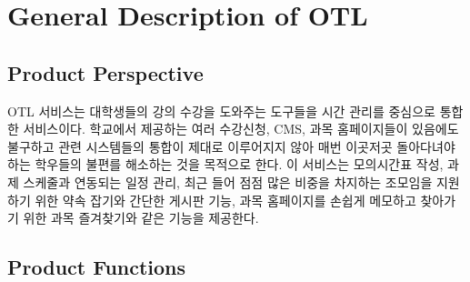 \documentclass[a4paper,titlepage]{article}
\begin{document}
\pagebreak
\section{General Description of OTL}
\subsection{Product Perspective}

OTL 서비스는 대학생들의 강의 수강을 도와주는 도구들을 시간 관리를 중심으로 통합한 서비스이다.
학교에서 제공하는 여러 수강신청, CMS, 과목 홈페이지들이 있음에도 불구하고 관련 시스템들의 통합이 제대로 이루어지지 않아 매번 이곳저곳 돌아다녀야 하는 학우들의 불편를 해소하는 것을 목적으로 한다.
이 서비스는 모의시간표 작성, 과제 스케줄과 연동되는 일정 관리, 최근 들어 점점 많은 비중을 차지하는 조모임을 지원하기 위한 약속 잡기와 간단한 게시판 기능, 과목 홈페이지를 손쉽게 메모하고 찾아가기 위한 과목 즐겨찾기와 같은 기능을 제공한다.

\subsection{Product Functions}
\end{document}

